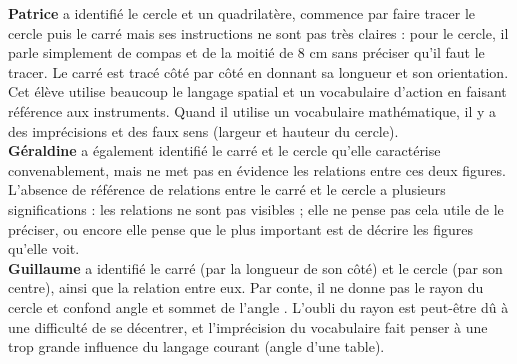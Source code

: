 \begin{itemize}
      {\bf Patrice} a identifié le cercle et un quadrilatère, commence par faire tracer le cercle puis le carré mais ses instructions ne sont pas très claires : pour le cercle, il parle simplement de compas et de la moitié de 8 cm sans préciser qu'il faut le tracer. Le carré est tracé côté par côté en donnant sa longueur et son orientation. Cet élève utilise beaucoup le langage spatial et un vocabulaire d'action en faisant référence aux instruments. Quand il utilise un vocabulaire mathématique, il y a des imprécisions et des faux sens (largeur et hauteur du cercle). \\
      {\bf Géraldine} a également identifié le carré et le cercle qu'elle caractérise convenablement, mais ne met pas en évidence les relations entre ces deux figures. L'absence de référence de relations entre le carré et le cercle a plusieurs significations : les relations ne sont pas visibles ; elle ne pense pas cela utile de le préciser, ou encore elle pense que le plus important est de décrire les figures qu'elle voit. \\
      {\bf Guillaume} a identifié le carré (par la longueur de son côté) et le cercle (par son centre), ainsi que la relation entre eux. Par conte, il ne donne pas le rayon du cercle et confond \og angle \fg{} et \og sommet de l'angle \fg{}. L'oubli du rayon est peut-être dû à une difficulté de se décentrer, et l'imprécision du vocabulaire fait penser à une trop grande influence du langage courant (angle d'une table).
\end{itemize}

